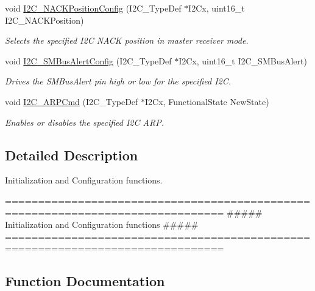 \begin{DoxyCompactItemize}
void \mbox{\hyperlink{group___i2_c___group1_gad08ebffc3a234d84e6405ec115bd74f1}{I2\+C\+\_\+\+N\+A\+C\+K\+Position\+Config}} (I2\+C\+\_\+\+Type\+Def $\ast$I2\+Cx, uint16\+\_\+t I2\+C\+\_\+\+N\+A\+C\+K\+Position)
\begin{DoxyCompactList}\small\item\em Selects the specified I2C N\+A\+CK position in master receiver mode. \end{DoxyCompactList}\item 
void \mbox{\hyperlink{group___i2_c___group1_ga75a810776d9710d2f6d9c5d9e93241c6}{I2\+C\+\_\+\+S\+M\+Bus\+Alert\+Config}} (I2\+C\+\_\+\+Type\+Def $\ast$I2\+Cx, uint16\+\_\+t I2\+C\+\_\+\+S\+M\+Bus\+Alert)
\begin{DoxyCompactList}\small\item\em Drives the S\+M\+Bus\+Alert pin high or low for the specified I2C. \end{DoxyCompactList}\item 
void \mbox{\hyperlink{group___i2_c___group1_ga66d86742bf1be58b17ef8779ffc79d02}{I2\+C\+\_\+\+A\+R\+P\+Cmd}} (I2\+C\+\_\+\+Type\+Def $\ast$I2\+Cx, Functional\+State New\+State)
\begin{DoxyCompactList}\small\item\em Enables or disables the specified I2C A\+RP. \end{DoxyCompactList}\end{DoxyCompactItemize}


\subsection{Detailed Description}
Initialization and Configuration functions. 

\begin{DoxyVerb} ===============================================================================
            ##### Initialization and Configuration functions #####
 ===============================================================================  \end{DoxyVerb}
 

\subsection{Function Documentation}
\mbox{\label{group___i2_c___group1_ga7bb44e894d68a7991f564c43fb187486}} 
